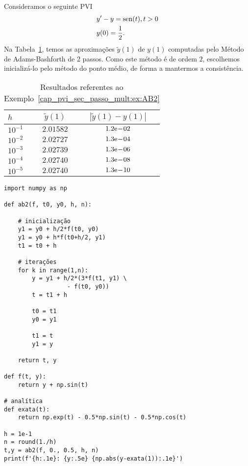 \begin{ex}\label{cap_pvi_sec_passo_mult:ex:AB2}
  Consideramos o seguinte PVI
  \begin{subequations}
    \begin{align}
      &y' - y = \operatorname{sen}(t), t>0\\
      &y(0) = \frac{1}{2}.
    \end{align}
  \end{subequations}
  Na Tabela~\ref{cap_pvi_sec_passo_mult:tab:ex_AB2}, temos as aproximações $\tilde{y}(1)$ de $y(1)$ computadas pelo Método de Adams-Bashforth de $2$ passos. Como este método é de ordem $2$, escolhemos inicializá-lo pelo método do ponto médio, de forma a mantermos a consistência.
 
  \begin{table}[H]
    \centering
    \caption{Resultados referentes ao Exemplo~\ref{cap_pvi_sec_passo_mult:ex:AB2}}
    \begin{tabular}{l|cc}
      $h$ & $\tilde{y}(1)$ & $|\tilde{y}(1)-y(1)|$\\\hline
      $10^{-1}$ & $2.01582$ & $1.2\mathrm{e}\!-\!02$ \\
      $10^{-2}$ & $2.02727$ & $1.3\mathrm{e}\!-\!04$ \\
      $10^{-3}$ & $2.02739$ & $1.3\mathrm{e}\!-\!06$ \\
      $10^{-4}$ & $2.02740$ & $1.3\mathrm{e}\!-\!08$ \\
      $10^{-5}$ & $2.02740$ & $1.3\mathrm{e}\!-\!10$ \\\hline
    \end{tabular}
    \label{cap_pvi_sec_passo_mult:tab:ex_AB2}
  \end{table}

\begin{lstlisting}[caption=abs2.py]
import numpy as np

def ab2(f, t0, y0, h, n):

    # inicialização
    y1 = y0 + h/2*f(t0, y0)
    y1 = y0 + h*f(t0+h/2, y1)
    t1 = t0 + h

    # iterações
    for k in range(1,n):
        y = y1 + h/2*(3*f(t1, y1) \
                  - f(t0, y0))
        t = t1 + h
        
        t0 = t1
        y0 = y1
        
        t1 = t
        y1 = y
        
    return t, y

def f(t, y):
    return y + np.sin(t)

# analítica
def exata(t):
    return np.exp(t) - 0.5*np.sin(t) - 0.5*np.cos(t)

h = 1e-1
n = round(1./h)
t,y = ab2(f, 0., 0.5, h, n)
print(f'{h:.1e}: {y:.5e} {np.abs(y-exata(1)):.1e}')
\end{lstlisting}
\end{ex}

